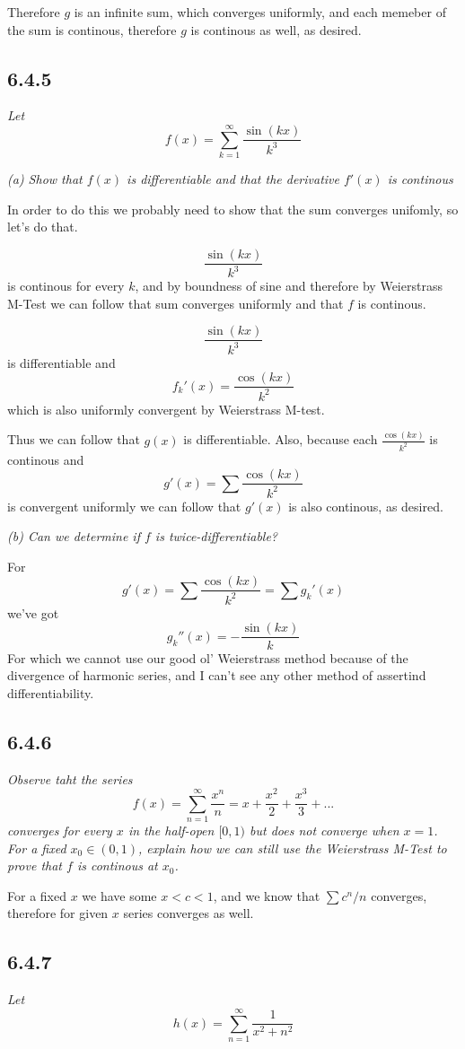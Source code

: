 \documentclass[11pt,oneside,titlepage]{book}
\begin{document}
Therefore $g$ is an infinite sum, which converges uniformly, and each
memeber of the sum is continous, therefore $g$ is continous as well, as
desired.

\subsection*{6.4.5}
\textit{Let }
$$f(x) = \sum_{k = 1}^{\infty}{\frac{\sin(kx)}{k^3}}$$

\textit{(a) Show that $f(x)$ is differentiable and that the derivative
  $f'(x)$ is continous}

In order to do this we probably need to show that the sum converges unifomly,
so let's do that.

$$\frac{\sin(kx)}{k^3}$$
is continous for every $k$, and by boundness of
sine and therefore by Weierstrass M-Test we can follow that sum converges
uniformly and that  $f$ is continous.

$$\frac{\sin(kx)}{k^3}$$
is differentiable and
$$f_k'(x) = \frac{\cos(kx)}{k^2}$$
which is also uniformly convergent by Weierstrass M-test.

Thus we can follow that $g(x)$ is differentiable. Also, because each
$\frac{\cos(kx)}{k^2}$ is continous and
$$g'(x) = \sum \frac{\cos(kx)}{k^2}$$
is convergent uniformly we can follow that $g'(x)$ is also continous, as
desired.

\textit{(b) Can we determine if $f$ is twice-differentiable?}

For
$$g'(x) = \sum \frac{\cos(kx)}{k^2} = \sum g_k'(x)$$
we've got
$$g_k''(x) = - \frac{\sin(kx)}{k}$$
For which we cannot use our good ol' Weierstrass method because of the
divergence of harmonic series, and I can't see any other method of assertind
differentiability.

\subsection*{6.4.6}
\textit{Observe taht the series }
$$f(x) = \sum_{n = 1}^{\infty}{\frac{x^n}{n}} = x + \frac{x^2}{2} +
\frac{x^3}{3} + ... $$
\textit{converges for every $x$ in the half-open $[0, 1)$ but does not
  converge when $x = 1$. For a fixed $x_0 \in (0, 1)$, explain how we can still
  use the Weierstrass M-Test to prove that $f$ is continous at $x_0$.}

For a fixed $x$ we have some $x < c < 1$, and we know that
$\sum c^n/n$ converges, therefore for given $x$ series converges as well.

\subsection*{6.4.7}
\textit{Let }
$$h(x) = \sum_{n = 1}^{\infty}{\frac{1}{x^2 + n^2}}$$
\end{document}
